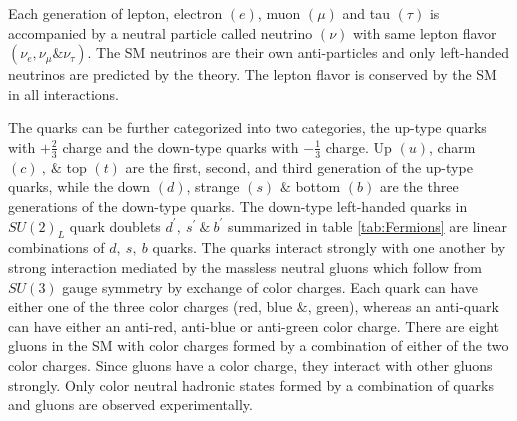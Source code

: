 Each generation of lepton, electron $(e)$, muon $(\mu)$ and tau $(\tau)$ is accompanied by a neutral particle called neutrino $(\nu)$ with same lepton flavor $(\nu_e, \nu_{\mu} \& \nu_{\tau})$. The SM neutrinos are their own anti-particles and only left-handed neutrinos are predicted by the theory. The lepton flavor is conserved by the SM in all interactions.

The quarks can be further categorized into two categories, the up-type quarks with $+\frac{2}{3}$ charge and the down-type quarks with $-\frac{1}{3}$ charge. Up $(u)$, charm  $(c)~,~\&$ top $(t)$ are the first, second, and third generation of the up-type quarks, while the down $(d)$, strange $(s)$ $\&$ bottom $(b)$ are the three generations of the down-type quarks. The down-type left-handed quarks in $SU(2)_{L}$ quark doublets $d^{'},~s^{'}~ \&~b^{'}$ summarized in table \ref{tab:Fermions} are linear combinations of $d,~s,~b$ quarks. The quarks interact strongly with one another by strong interaction mediated by the massless neutral gluons which follow from $SU(3)$ gauge symmetry by exchange of color charges. Each quark can have either one of the three color charges (red, blue $\&$, green), whereas an anti-quark can have either an anti-red, anti-blue or anti-green color charge. There are eight gluons in the SM with color charges formed by a combination of either of the two color charges. Since gluons have a color charge, they interact with other gluons strongly. Only color neutral hadronic states formed by a combination of quarks and gluons are observed experimentally.

